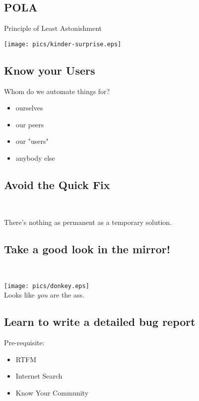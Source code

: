 \documentclass[xga]{xdvislides}
\begin{document}
\subsection{POLA}
Principle of Least Astonishment
\\
\vspace*{\fill}
\begin{center}
	\texttt{[image: pics/kinder-surprise.eps]}
\end{center}
\vspace*{\fill}

\subsection{Know your Users}
Whom do we automate things for?
\begin{itemize}
	\item ourselves
	\item our peers
	\item our "users"
	\item anybody else
\end{itemize}

\subsection{Avoid the Quick Fix}
\\
\Huge
\begin{center}
	There's nothing as permanent as a temporary solution.
\end{center}
\Normalsize

\subsection{Take a good look in the mirror!}
\\
\vspace*{\fill}
\begin{center}
	\texttt{[image: pics/donkey.eps]} \\
	\small
	Looks like {\em you} are the ass.
\end{center}
\vspace*{\fill}

\subsection{Learn to write a detailed bug report}
Pre-requisite:
\begin{itemize}
	\item RTFM
	\item Internet Search
	\item Know Your Community
\end{itemize}
\end{document}
